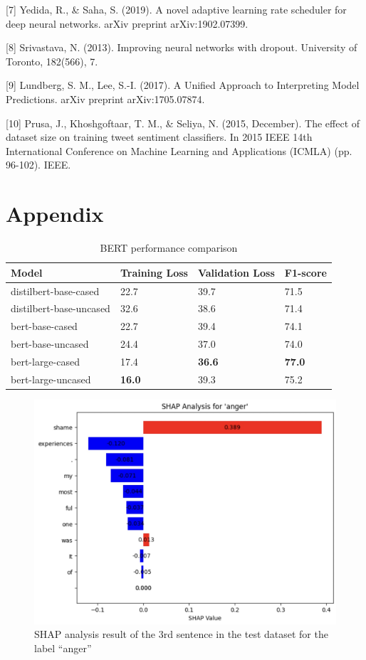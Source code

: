 \documentclass[11pt]{article}
\begin{document}
[7] Yedida, R., \& Saha, S. (2019). A novel adaptive learning rate scheduler for deep neural networks. arXiv preprint arXiv:1902.07399.

[8] Srivastava, N. (2013). Improving neural networks with dropout. University of Toronto, 182(566), 7.

[9] Lundberg, S. M., Lee, S.-I. (2017). A Unified Approach to Interpreting Model Predictions. arXiv preprint arXiv:1705.07874.

[10] Prusa, J., Khoshgoftaar, T. M., \& Seliya, N. (2015, December). The effect of dataset size on training tweet sentiment classifiers. In 2015 IEEE 14th International Conference on Machine Learning and Applications (ICMLA) (pp. 96-102). IEEE.

\clearpage
\onecolumn
\section{Appendix}

\begin{table}[htp]
\caption{BERT performance comparison}
\centering
\begin{tabular}{|l|l|l|l|}
\hline
\textbf{Model} & \textbf{Training Loss} & \textbf{Validation Loss} & \textbf{F1-score} \\ \hline
distilbert-base-cased   & 22.7 & 39.7 & 71.5 \\ \hline
distilbert-base-uncased & 32.6 & 38.6 & 71.4 \\ \hline
bert-base-cased         & 22.7 & 39.4 & 74.1 \\ \hline
bert-base-uncased       & 24.4 & 37.0 & 74.0 \\ \hline
bert-large-cased        & 17.4 & \textbf{36.6} & \textbf{77.0} \\ \hline
bert-large-uncased      & \textbf{16.0} & 39.3 & 75.2 \\ \hline
\end{tabular}
\label{tab:bert_performance}
\end{table}

\begin{figure}[htp]
    \centering
    \includegraphics[width=0.8\linewidth]{images/figure1.jpg}
    \caption{SHAP analysis result of the 3rd sentence in the test dataset for the label “anger”}
    \label{fig:figure1}
\end{figure}
\end{document}
